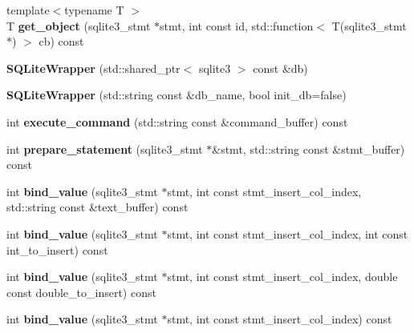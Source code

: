 \begin{DoxyCompactItemize}
{\footnotesize template$<$typename T $>$ }\\T {\bfseries get\+\_\+object} (sqlite3\+\_\+stmt $\ast$stmt, int const id, std\+::function$<$ T(sqlite3\+\_\+stmt $\ast$) $>$ cb) const
\item 
\mbox{\label{class_s_q_lite_wrapper_a9a61e968f7a892ddb9383fa8db001705}} 
{\bfseries S\+Q\+Lite\+Wrapper} (std\+::shared\+\_\+ptr$<$ sqlite3 $>$ const \&db)
\item 
\mbox{\label{class_s_q_lite_wrapper_ae1fce784c6c43a9deea31f68fc2e9966}} 
{\bfseries S\+Q\+Lite\+Wrapper} (std\+::string const \&db\+\_\+name, bool init\+\_\+db=false)
\item 
\mbox{\label{class_s_q_lite_wrapper_affeef069fe57f5340b64cd5dd41a5b51}} 
int {\bfseries execute\+\_\+command} (std\+::string const \&command\+\_\+buffer) const
\item 
\mbox{\label{class_s_q_lite_wrapper_a8635a805eb0012f6ef97335e003d740f}} 
int {\bfseries prepare\+\_\+statement} (sqlite3\+\_\+stmt $\ast$\&stmt, std\+::string const \&stmt\+\_\+buffer) const
\item 
\mbox{\label{class_s_q_lite_wrapper_a8cbdaf79201aabb1a70208cd1264b004}} 
int {\bfseries bind\+\_\+value} (sqlite3\+\_\+stmt $\ast$stmt, int const stmt\+\_\+insert\+\_\+col\+\_\+index, std\+::string const \&text\+\_\+buffer) const
\item 
\mbox{\label{class_s_q_lite_wrapper_a3dd12d5bcf5c795ed14d38835b24c8f5}} 
int {\bfseries bind\+\_\+value} (sqlite3\+\_\+stmt $\ast$stmt, int const stmt\+\_\+insert\+\_\+col\+\_\+index, int const int\+\_\+to\+\_\+insert) const
\item 
\mbox{\label{class_s_q_lite_wrapper_ad76118f495723394edf380cf70e0e381}} 
int {\bfseries bind\+\_\+value} (sqlite3\+\_\+stmt $\ast$stmt, int const stmt\+\_\+insert\+\_\+col\+\_\+index, double const double\+\_\+to\+\_\+insert) const
\item 
\mbox{\label{class_s_q_lite_wrapper_a3bfa48072fccfb0ab7591f240b468112}} 
int {\bfseries bind\+\_\+value} (sqlite3\+\_\+stmt $\ast$stmt, int const stmt\+\_\+insert\+\_\+col\+\_\+index) const

\end{DoxyCompactItemize}
